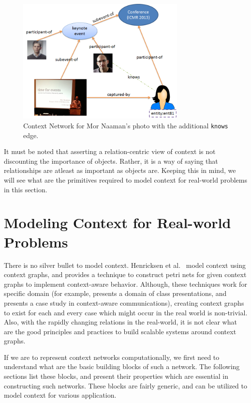 \begin{figure}[h]
\centering
\includegraphics[width=0.75\textwidth]{media/chapter2/naaman-friends.png}
\caption{Context Network for Mor Naaman's photo with the additional \texttt{knows} edge.}
\label{fig:context-network}
\end{figure}

It must be noted that asserting a relation-centric view of context is not discounting the importance of objects. Rather, it is a way of saying that relationships are atleast as important as objects are. Keeping this in mind, we will see what are the primitives required to model context for real-world problems in this section.

\section{Modeling Context for Real-world Problems}

There is no silver bullet to model context. Henricksen et al.\ \cite{henricksen2002modeling} model context using context graphs, and \cite{reignier2007context} provides a technique to construct petri nets for given context graphs to implement context-aware behavior. Although, these techniques work for specific domain (for example, \cite{reignier2007context} presents a domain of class presentations, and \cite{henricksen2002modeling} presents a case study in context-aware communications), creating context graphs to exist for each and every case which might occur in the real world is non-trivial. Also, with the rapidly changing relations in the real-world, it is not clear what are the good principles and practices to build scalable systems around context graphs.

If we are to represent context networks computationally, we first need to understand what are the basic building blocks of such a network. The following sections list these blocks, and present their properties which are essential in constructing such networks. These blocks are fairly generic, and can be utilized to model context for various application.

